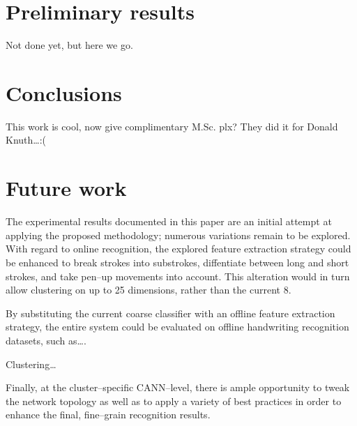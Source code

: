 \documentclass[10pt,conference,a4paper]{IEEEtran}
\begin{document}
	\section{Preliminary results}
	\label{sec:experiment_results}

	Not done yet, but here we go.


	\section{Conclusions}
	\label{sec:conclusions}

	This work is cool, now give complimentary M.Sc. plx?
	They did it for Donald Knuth\ldots :(


	\section{Future work}
	\label{sec:future_work}

	The experimental results documented in this paper are an initial attempt at applying the proposed methodology;
	numerous variations remain to be explored. With regard to online recognition, the explored feature extraction
	strategy could be enhanced to break strokes into substrokes, diffentiate between long and short strokes, and take
	pen--up movements into account. This alteration would in turn allow clustering on up to 25 dimensions, rather than the current 8.

	By substituting the current coarse classifier with an offline feature extraction strategy, the entire system could
	be evaluated on offline handwriting recognition datasets, such as\ldots. 

	Clustering\ldots

	Finally, at the cluster--specific CANN--level, there is ample opportunity to tweak the network topology as well as
	to apply a variety of best practices \cite{simard2003best} in order to enhance the final, fine--grain recognition results.



	
\end{document}
